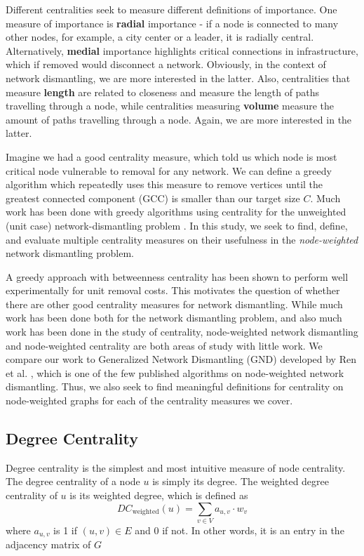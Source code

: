 \documentclass{article}
\begin{document}
 Different centralities seek to measure different definitions of importance. One measure of importance is \textbf{radial} importance - if a node is connected to many other nodes, for example, a city center or a leader, it is radially central. 
 Alternatively, \textbf{medial} importance highlights critical connections in infrastructure, which if removed would disconnect a network. Obviously, in the context of network dismantling, we are more interested in the latter. 
 Also, centralities that measure \textbf{length} are related to closeness and measure the length of paths travelling through a node, while centralities measuring \textbf{volume} measure the amount of paths travelling through a node. Again, we are more interested in the latter.
 
 Imagine we had a good centrality measure, which told us which node is most critical node vulnerable to removal for any network. 
 We can define a greedy algorithm which repeatedly uses this measure to remove vertices until the greatest connected component (GCC) is smaller than our target size $C$. 
 Much work has been done with greedy algorithms using centrality for the unweighted (unit case) network-dismantling problem \cite{analysis}. 
 In this study, we seek to find, define, and evaluate multiple centrality measures on their usefulness in the \textit{node-weighted} network dismantling problem.

 A greedy approach with betweenness centrality has been shown to perform well experimentally for unit removal costs. This motivates the question of whether there are other good centrality measures for network dismantling. While much work has been done both for the network dismantling problem, and also much work has been done in the study of centrality, node-weighted network dismantling and node-weighted centrality are both areas of study with little work. We compare our work to Generalized Network Dismantling (GND) developed by Ren et al. \cite{gnd}, which is one of the few published algorithms on node-weighted network dismantling. Thus, we also seek to find meaningful definitions for centrality on node-weighted graphs for each of the centrality measures we cover.


\subsection{Degree Centrality}
Degree centrality is the simplest and most intuitive measure of node centrality. 
The degree centrality of a node $u$ is simply its degree. 
The weighted degree centrality of $u$ is its weighted degree, which is defined as $$ DC_{\text{weighted}}(u) = \sum_{v \in V} a_{u,v} \cdot w_v $$ where $a_{u, v}$ is 1 if $(u, v) \in E$ and 0 if not. 
In other words, it is an entry in the adjacency matrix of $G$
\end{document}
